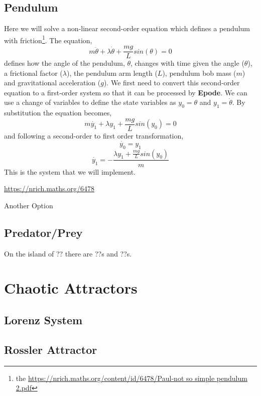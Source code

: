 \documentclass[letterpaper,10pt]{book}
\newcommand{\epode}[0]{\textbf{Epode}}
\begin{document}
    \section{Pendulum}
      Here we will solve a non-linear second-order equation which defines a pendulum with friction\footnote{the \url{https://nrich.maths.org/content/id/6478/Paul-not so simple pendulum 2.pdf}}.  The equation,
      \begin{equation}
	m\ddot{\theta} + \lambda\dot{\theta} + \frac{m g}{L}sin(\theta) = 0
      \end{equation}
      defines how the angle of the pendulum, $\theta$, changes with time given the angle ($\theta$), a frictional factor ($\lambda$), the pendulum arm length ($L$), pendulum bob mass ($m$) and gravitational acceleration ($g$).  We first need to convert this second-order equation to a first-order system so that it can be processed by \epode{}.  We can use a change of variables to define the state variables as $y_{0} = \theta$ and $y_{1} = \dot{\theta}$.  By substitution the equation becomes,
      \begin{equation}
	m\dot{y_1} + \lambda{}y_1 + \frac{m g}{L}sin(y_0) = 0
      \end{equation}
      and following a second-order to first order transformation,
      \begin{equation}
	\dot{y_0} = y_{1}
      \end{equation}
      \begin{equation}
	\dot{y_1} = -\frac{\lambda{}y_{1} + \frac{m g}{L}sin(y_0)}{m}
      \end{equation}
      This is the system that we will implement.
      
      \url{https://nrich.maths.org/6478}
      
      Another Option\cite{nelson1986pendulum}

      
    \section{Predator/Prey}
      On the island of ?? there are ??s and ??s.
      
  \chapter{Chaotic Attractors}
    \section{Lorenz System}
    \section{Rossler Attractor}
\end{document}
